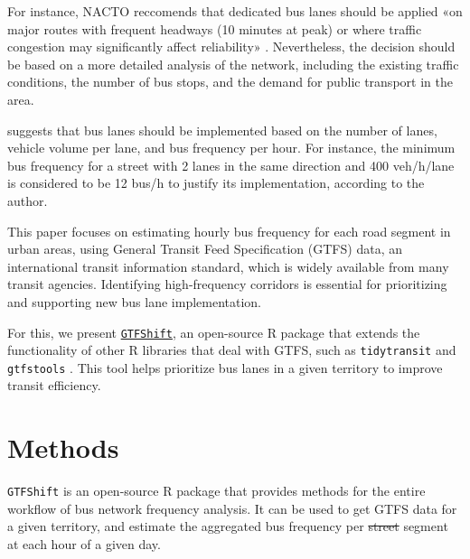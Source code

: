 \documentclass[
]{article}
\providecommand{\DIFadd}[1]{{\protect\color{green}{#1}}} %
\providecommand{\DIFdel}[1]{{\protect\color{red}\sout{#1}}}                      %
\providecommand{\DIFaddbegin}{} %
\providecommand{\DIFaddend}{} %
\providecommand{\DIFdelbegin}{} %
\providecommand{\DIFdelend}{} %
\newcommand{\DIFscaledelfig}{0.5}
\newlength{\DIFdelgraphicswidth} %
\newlength{\DIFdelgraphicsheight} %
\newcommand{\DIFaddincludegraphics}[2][]{{\color{blue}\fbox{\DIFOincludegraphics[#1]{#2}}}} %
\newcommand{\DIFdelincludegraphics}[2][]{%
\sbox{\DIFdelgraphicsbox}{\DIFOincludegraphics[#1]{#2}}%
\settoboxwidth{\DIFdelgraphicswidth}{\DIFdelgraphicsbox} %
\settoboxtotalheight{\DIFdelgraphicsheight}{\DIFdelgraphicsbox} %
\scalebox{\DIFscaledelfig}{%
\parbox[b]{\DIFdelgraphicswidth}{\usebox{\DIFdelgraphicsbox}\\[-\baselineskip] \rule{\DIFdelgraphicswidth}{0em}}\llap{\resizebox{\DIFdelgraphicswidth}{\DIFdelgraphicsheight}{%
\setlength{\unitlength}{\DIFdelgraphicswidth}%
\begin{picture}(1,1)%
\thicklines\linethickness{2pt} %
{\color[rgb]{1,0,0}\put(0,0){\framebox(1,1){}}}%
{\color[rgb]{1,0,0}\put(0,0){\line( 1,1){1}}}%
{\color[rgb]{1,0,0}\put(0,1){\line(1,-1){1}}}%
\end{picture}%
}\hspace*{3pt}}} %
} %
\DeclareRobustCommand{\DIFaddbegin}{\DIFOaddbegin \let\includegraphics\DIFaddincludegraphics} %
\DeclareRobustCommand{\DIFaddend}{\DIFOaddend \let\includegraphics\DIFOincludegraphics} %
\DeclareRobustCommand{\DIFdelbegin}{\DIFOdelbegin \let\includegraphics\DIFdelincludegraphics} %
\DeclareRobustCommand{\DIFdelend}{\DIFOaddend \let\includegraphics\DIFOincludegraphics} %
\begin{document}
For instance, NACTO reccomends that dedicated bus lanes should be applied «on major routes with frequent headways (10 minutes at peak) or where traffic congestion may significantly affect reliability» \citep{nacto2016transit}.
Nevertheless, the decision should be based on a more detailed analysis of the network, including the existing traffic conditions, the number of bus stops, and the demand for public transport in the area.

\citet{vuchic1981} suggests that bus lanes should be implemented based on the number of lanes, vehicle volume per lane, and bus frequency per hour. For instance, the minimum bus frequency for a street with 2 lanes in the same direction and 400 veh/h/lane is considered to be 12 bus/h to justify its implementation, according to the author.

This paper focuses on estimating hourly bus frequency for each road \DIFaddbegin \DIFadd{network }\DIFaddend segment in urban areas, using General Transit Feed Specification (GTFS) data, an international transit information standard, which is widely available from many transit agencies.
Identifying high-frequency corridors is essential for prioritizing and supporting new bus lane implementation.

For this, we present \href{https://u-shift.github.io/GTFShift/}{\texttt{GTFShift}}, an open-source R package \citep{gshift2025} that extends the functionality of other R libraries that deal with GTFS, such as \texttt{tidytransit} \citep{tidytransit} and \texttt{gtfstools} \citep{gtfstools}.
This tool helps prioritize bus lanes in a given territory to improve transit efficiency.

\section{Methods}\label{methods}

\texttt{GTFShift} is an open-source R package that provides methods for the entire workflow of bus network frequency analysis.
It can be used to get GTFS data for a given territory, and estimate the aggregated bus frequency per \DIFdelbegin \DIFdel{street }\DIFdelend \DIFaddbegin \DIFadd{road network }\DIFaddend segment at each hour of a given day.

\DIFaddbegin \DIFadd{For this analysis, two main methods are used:
}
\end{document}
